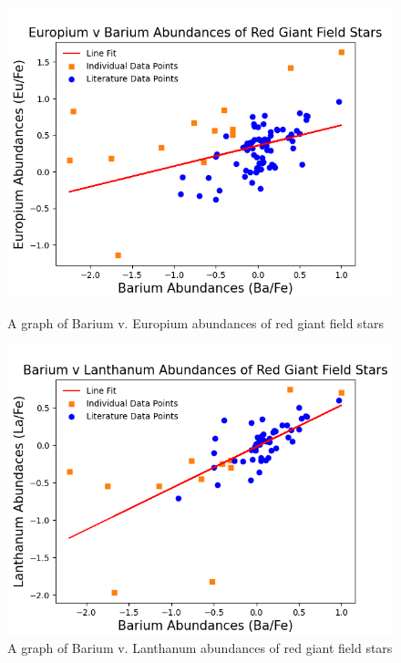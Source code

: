 \begin{figure}[H]
  \includegraphics[width=\textwidth]{Ba_v_Eu.png}
  \caption{A graph of Barium v. Europium abundances of red giant field stars}
  \label{Ba_v_Eu}

  \includegraphics[width=\textwidth]{Ba_v_La.png}
  \caption{A graph of Barium v. Lanthanum abundances of red giant field stars}
  \label{Ba_v_La}
\end{figure}


